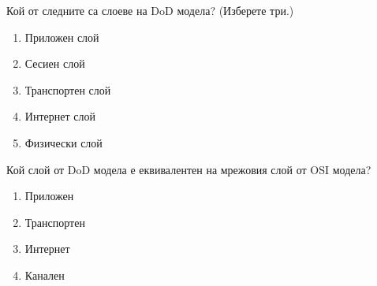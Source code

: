 \begin{q}
  Кой от следните са слоеве на DoD модела? (Изберете три.)

  \begin{enumerate}
  \item Приложен слой
  \item Сесиен слой
  \item Транспортен слой
  \item Интернет слой
  \item Физически слой
  \end{enumerate}
\end{q}

\begin{q}
  Кой слой от DoD модела е еквивалентен на мрежовия слой от OSI модела?

  \begin{enumerate}
  \item Приложен
  \item Транспортен
  \item Интернет
  \item Канален
  \end{enumerate}
\end{q}